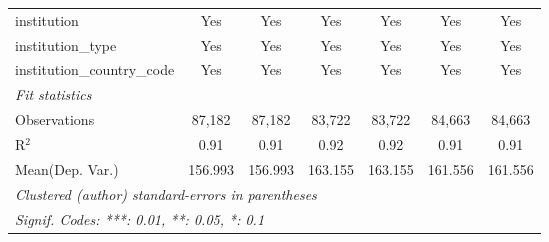 \begin{tabular}{lcccccc}
   institution                        & Yes    & Yes     & Yes    & Yes     & Yes    & Yes\\  
   institution\_type                  & Yes    & Yes     & Yes    & Yes     & Yes    & Yes\\  
   institution\_country\_code         & Yes    & Yes     & Yes    & Yes     & Yes    & Yes\\  
   \midrule
   \emph{Fit statistics}\\
   Observations                       & 87,182 & 87,182  & 83,722 & 83,722  & 84,663 & 84,663\\  
   R$^2$                              & 0.91   & 0.91    & 0.92   & 0.92    & 0.91   & 0.91\\  
Mean(Dep. Var.) & 156.993 & 156.993 & 163.155 & 163.155 & 161.556 & 161.556 \\
   \midrule \midrule
   \multicolumn{7}{l}{\emph{Clustered (author) standard-errors in parentheses}}\\
   \multicolumn{7}{l}{\emph{Signif. Codes: ***: 0.01, **: 0.05, *: 0.1}}\\
\end{tabular}
\par\endgroup

